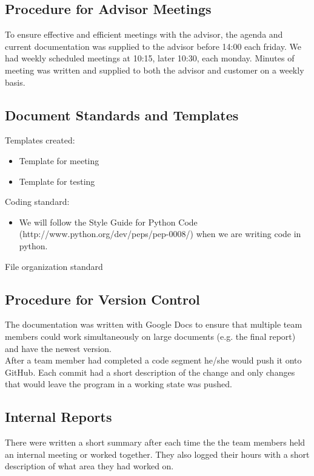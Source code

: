 \documentclass{report}
\begin{document}
\subsection{Procedure for Advisor Meetings} \label{subsec:procedure_adv_meet}
To ensure effective and efficient meetings with the advisor, the agenda and current documentation was supplied to the advisor before 14:00 each friday. We had weekly scheduled meetings at 10:15, later 10:30, each monday. Minutes of meeting was written and supplied to both the advisor and customer on a weekly basis.

\subsection{Document Standards and Templates} \label{subsec:doc_stand}
Templates created:
\begin{itemize}
    \item Template for meeting
    \item Template for testing
\end{itemize}
Coding standard:
\begin{itemize}
    \item We will follow the Style Guide for Python Code (http://www.python.org/dev/peps/pep-0008/) when we are writing code in python.
\end{itemize}
File organization standard %

\subsection{Procedure for Version Control} \label{subsec:proc_vers}
The documentation was written with Google Docs to ensure that multiple team members could work simultaneously on large documents (e.g. the final report) and have the newest version.
\\
After a team member had completed a code segment he/she would push it onto GitHub. Each commit had a short description of the change and only changes that would leave the program in a working state was pushed.

\subsection{Internal Reports} \label{subsec:internal_reports}
There were written a short summary after each time the the team members held an internal meeting or worked together. They also logged their hours with a short description of what area they had worked on.
\end{document}
